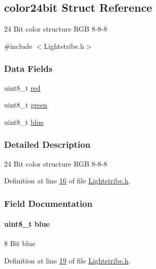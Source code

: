 \hypertarget{structcolor24bit}{}\subsection{color24bit Struct Reference}
\label{structcolor24bit}


24 Bit color structure R\+G\+B 8-\/8-\/8  




{\ttfamily \#include $<$Lightstribe.\+h$>$}

\subsubsection*{Data Fields}
\begin{DoxyCompactItemize}
\item 
uint8\+\_\+t \hyperlink{structcolor24bit_ad47d918910aaa51c73160ac85999d09c}{red}
\item 
uint8\+\_\+t \hyperlink{structcolor24bit_a90d21fa503b626c00cdc8d94863d5877}{green}
\item 
uint8\+\_\+t \hyperlink{structcolor24bit_a287b397e90d7b995c81ff54e741f96b2}{blue}
\end{DoxyCompactItemize}


\subsubsection{Detailed Description}
24 Bit color structure R\+G\+B 8-\/8-\/8 

Definition at line \hyperlink{_lightstribe_8h_source_l00016}{16} of file \hyperlink{_lightstribe_8h_source}{Lightstribe.\+h}.



\subsubsection{Field Documentation}
\hypertarget{structcolor24bit_a287b397e90d7b995c81ff54e741f96b2}{}
\paragraph[{blue}]{\setlength{\rightskip}{0pt plus 5cm}uint8\+\_\+t blue}\label{structcolor24bit_a287b397e90d7b995c81ff54e741f96b2}
8 Bit blue 

Definition at line \hyperlink{_lightstribe_8h_source_l00019}{19} of file \hyperlink{_lightstribe_8h_source}{Lightstribe.\+h}.

